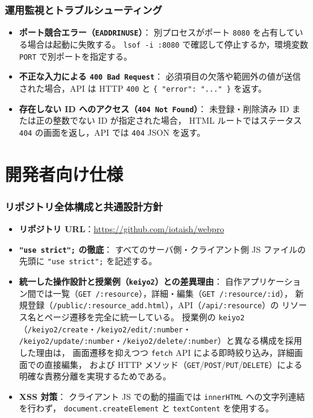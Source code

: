 \documentclass[
  a4paper,
  fontsize=11pt,
  line_length=40zw,
  number_of_lines=35,
  baselineskip=1.7zw
]{jlreq}
\begin{document}
\section{運用監視とトラブルシューティング}

\begin{itemize}
  \item \textbf{ポート競合エラー（\texttt{EADDRINUSE}）}：
    別プロセスがポート \texttt{8080} を占有している場合は起動に失敗する。
    \texttt{lsof -i :8080} で確認して停止するか，環境変数 \texttt{PORT} で別ポートを指定する。
  \item \textbf{不正な入力による \texttt{400 Bad Request}}：
    必須項目の欠落や範囲外の値が送信された場合，API は HTTP \texttt{400} と
    \texttt{\{ "error": "..." \}} を返す。
  \item \textbf{存在しない ID へのアクセス（\texttt{404 Not Found}）}：
    未登録・削除済み ID または正の整数でない ID が指定された場合，
    HTML ルートではステータス \texttt{404} の画面を返し，API では \texttt{404} JSON を返す。
\end{itemize}

\part{開発者向け仕様}

\section{リポジトリ全体構成と共通設計方針}

\begin{itemize}
  \item \textbf{リポジトリ URL}：\url{https://github.com/iotaish/webpro}
  \item \textbf{\texttt{"use strict";} の徹底}：
    すべてのサーバ側・クライアント側 JS ファイルの先頭に \texttt{"use strict";} を記述する。
  \item \textbf{統一した操作設計と授業例（\texttt{keiyo2}）との差異理由}：
    自作アプリケーション間では一覧（\texttt{GET /:resource}），詳細・編集（\texttt{GET /:resource/:id}），
    新規登録（\texttt{/public/:resource\_add.html}），API（\texttt{/api/:resource}）の
    リソース名とページ遷移を完全に統一している。
    授業例の \texttt{keiyo2}（\texttt{/keiyo2/create}・\texttt{/keiyo2/edit/:number}・
    \texttt{/keiyo2/update/:number}・\texttt{/keiyo2/delete/:number}）と異なる構成を採用した理由は，
    画面遷移を抑えつつ \texttt{fetch} API による即時絞り込み，詳細画面での直接編集，
    および HTTP メソッド（\texttt{GET}/\texttt{POST}/\texttt{PUT}/\texttt{DELETE}）による
    明確な責務分離を実現するためである。
  \item \textbf{XSS 対策}：
    クライアント JS での動的描画では \texttt{innerHTML} への文字列連結を行わず，
    \texttt{document.createElement} と \texttt{textContent} を使用する。
\end{itemize}
\end{document}
